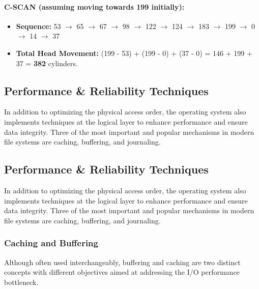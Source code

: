 \documentclass[12pt]{article}
\begin{document}
\paragraph{C-SCAN (assuming moving towards 199 initially):}
\begin{itemize}
    \item \textbf{Sequence:} 53 \(\rightarrow\) 65 \(\rightarrow\) 67 \(\rightarrow\) 98 \(\rightarrow\) 122 \(\rightarrow\) 124 \(\rightarrow\) 183 \(\rightarrow\) 199 \(\rightarrow\) 0 \(\rightarrow\) 14 \(\rightarrow\) 37
    \item \textbf{Total Head Movement:} (199 - 53) + (199 - 0) + (37 - 0) = 146 + 199 + 37 = \textbf{382} cylinders.
\end{itemize}


\subsection{Performance \& Reliability Techniques}
In addition to optimizing the physical access order, the operating system also implements techniques at the logical layer to enhance performance and ensure data integrity. Three of the most important and popular mechanisms in modern file systems are caching, buffering, and journaling.


\subsection{Performance \& Reliability Techniques}
In addition to optimizing the physical access order, the operating system also implements techniques at the logical layer to enhance performance and ensure data integrity. Three of the most important and popular mechanisms in modern file systems are caching, buffering, and journaling.

\subsubsection{Caching and Buffering}
Although often used interchangeably, buffering and caching are two distinct concepts with different objectives aimed at addressing the I/O performance bottleneck.
\end{document}
